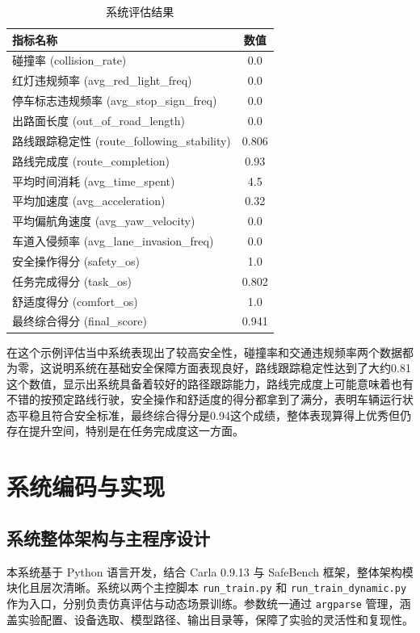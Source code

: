 \begin{table}[H]
	\centering
	\caption{系统评估结果}
	\label{tab:evaluation_results}
	\begin{tabular}{lc}
		\toprule
		指标名称 & 数值 \\
		\midrule
		碰撞率 (collision\_rate) & 0.0 \\
		红灯违规频率 (avg\_red\_light\_freq) & 0.0 \\
		停车标志违规频率 (avg\_stop\_sign\_freq) & 0.0 \\
		出路面长度 (out\_of\_road\_length) & 0.0 \\
		路线跟踪稳定性 (route\_following\_stability) & 0.806 \\
		路线完成度 (route\_completion) & 0.93 \\
		平均时间消耗 (avg\_time\_spent) & 4.5 \\
		平均加速度 (avg\_acceleration) & 0.32 \\
		平均偏航角速度 (avg\_yaw\_velocity) & 0.0 \\
		车道入侵频率 (avg\_lane\_invasion\_freq) & 0.0 \\
		安全操作得分 (safety\_os) & 1.0 \\
		任务完成得分 (task\_os) & 0.802 \\
		舒适度得分 (comfort\_os) & 1.0 \\
		最终综合得分 (final\_score) & 0.941 \\
		\bottomrule
	\end{tabular}
\end{table}

在这个示例评估当中系统表现出了较高安全性，碰撞率和交通违规频率两个数据都为零，这说明系统在基础安全保障方面表现良好，路线跟踪稳定性达到了大约0.81这个数值，显示出系统具备着较好的路径跟踪能力，路线完成度上可能意味着也有不错的按预定路线行驶，安全操作和舒适度的得分都拿到了满分，表明车辆运行状态平稳且符合安全标准，最终综合得分是0.94这个成绩，整体表现算得上优秀但仍存在提升空间，特别是在任务完成度这一方面。




\section{系统编码与实现}

\subsection{系统整体架构与主程序设计}

本系统基于 Python 语言开发，结合 Carla 0.9.13 与 SafeBench 框架，整体架构模块化且层次清晰。系统以两个主控脚本 \texttt{run\_train.py} 和 \texttt{run\_train\_dynamic.py} 作为入口，分别负责仿真评估与动态场景训练。参数统一通过 \texttt{argparse} 管理，涵盖实验配置、设备选取、模型路径、输出目录等，保障了实验的灵活性和复现性。

